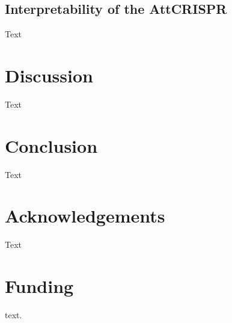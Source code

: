 \documentclass{bioinfo}
\begin{document}
\subsection{Interpretability of the AttCRISPR}\label{section:interpretability}

Text

\section{Discussion}

Text

\section{Conclusion}

Text

\section*{Acknowledgements}

Text\vspace*{-12pt}

\section*{Funding}

 text.\vspace*{-12pt}



\end{document}
